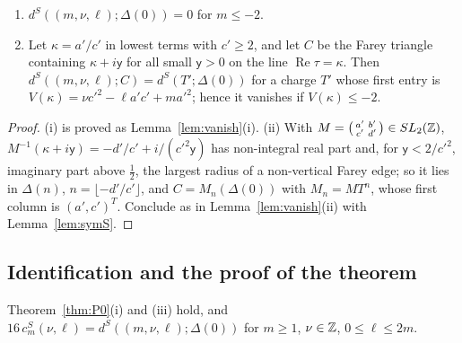 \begin{lemma}\label{lem:vanishS}
\begin{enumerate}
\item[(i)] $d^S((m,\nu,\ell);\Delta(0))=0$ for $m\le-2$.
\item[(ii)] Let $\kappa=a'/c'$ in lowest terms with $c'\ge2$, and let $C$ be the Farey triangle containing $\kappa+i\mathsf y$ for all small $\mathsf y>0$ on the line $\operatorname{Re}\tau=\kappa$. Then $d^S((m,\nu,\ell);C)=d^S(T';\Delta(0))$ for a charge $T'$ whose first entry is $V(\kappa)=\nu c'^2-\ell a'c'+ma'^2$; hence it vanishes if $V(\kappa)\le-2$.
\end{enumerate}
\end{lemma}

\begin{proof}
(i) is proved as Lemma~\ref{lem:vanish}(i). (ii) With $M=\begin{psmallmatrix}a'&b'\\c'&d'\end{psmallmatrix}\in SL_2(\mathbb{Z})$, $M^{-1}(\kappa+i\mathsf y)=-d'/c'+i/(c'^2\mathsf y)$ has non-integral real part and, for $\mathsf y<2/c'^2$, imaginary part above $\frac12$, the largest radius of a non-vertical Farey edge; so it lies in $\Delta(n)$, $n=\lfloor-d'/c'\rfloor$, and $C=M_n(\Delta(0))$ with $M_n=MT^n$, whose first column is $(a',c')^T$. Conclude as in Lemma~\ref{lem:vanish}(ii) with Lemma~\ref{lem:symS}.
\end{proof}

\subsection{Identification and the proof of the theorem}

\begin{proposition}\label{prop:identS}
Theorem~\ref{thm:P0}(i) and (iii) hold, and $16\,c^S_m(\nu,\ell)=d^S((m,\nu,\ell);\Delta(0))$ for $m\ge1$, $\nu\in\mathbb{Z}$, $0\le\ell\le2m$.
\end{proposition}

